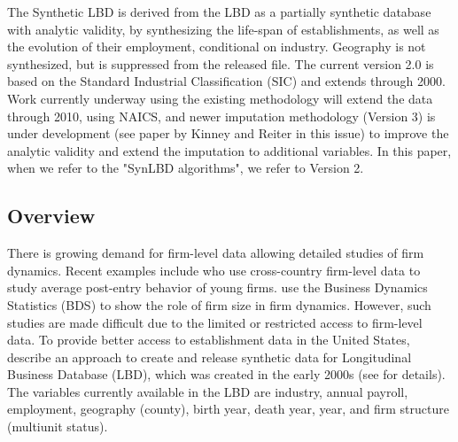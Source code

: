 

The Synthetic LBD is derived from the LBD as a partially synthetic database with analytic validity, by synthesizing the life-span of establishments, as well as the evolution of their employment, conditional on industry. Geography is not synthesized, but is suppressed from the released file. The current version 2.0 is based on the Standard Industrial Classification (SIC) and extends through 2000. Work currently underway using the existing methodology will extend the data through 2010, using NAICS, and newer imputation methodology (Version 3) is under development (see paper by Kinney and Reiter in this issue) to improve the analytic validity and extend the imputation to additional variables. In this paper, when we refer to the "SynLBD algorithms", we refer to Version 2. \\

\subsection{Overview}

There is growing demand for firm-level data allowing detailed studies of firm dynamics. Recent examples include \textcite{NBERc0480} who use cross-country firm-level data to study average post-entry behavior of young firms. \textcite{10.1257/aer.20141280} use the Business Dynamics Statistics (BDS) to show the role of firm size in firm dynamics. However, such studies are made difficult due to the limited or restricted access to firm-level data. To provide better access to establishment data in the United States, \textcite{KinneyEtAl2011} describe an approach to create and release synthetic data for Longitudinal Business Database (LBD), which was created in the early 2000s (see \textcite{RePEc:cen:wpaper:02-17} for details). The variables currently available in the LBD are industry, annual payroll, employment, geography (county), birth year, death year, year, and firm structure (multiunit status).    

